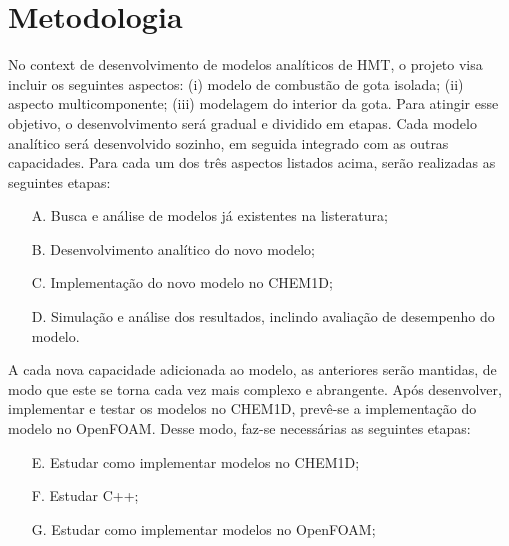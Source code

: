 \section{Metodologia}


No context de desenvolvimento de modelos analíticos de HMT, o projeto visa  incluir os seguintes aspectos:
(i) modelo de combustão de gota isolada;
(ii) aspecto multicomponente; 
(iii) modelagem do interior da gota. 
Para atingir esse objetivo, o desenvolvimento será gradual e dividido em etapas. 
Cada modelo analítico será desenvolvido sozinho, em seguida integrado com as outras capacidades.
Para cada um dos três aspectos listados acima, serão realizadas as seguintes etapas:
\begin{enumerate}
    \item[A.] Busca e análise de modelos já existentes na listeratura;
    \item[B.] Desenvolvimento analítico do novo modelo;
    \item[C.] Implementação do novo modelo no CHEM1D;
    \item[D.] Simulação e análise dos resultados, inclindo avaliação de desempenho do modelo.
\end{enumerate}
A cada nova capacidade adicionada ao modelo, as anteriores serão mantidas, de modo que este se torna cada vez mais complexo e abrangente. 
Após desenvolver, implementar e testar os modelos no CHEM1D, prevê-se a implementação do modelo no OpenFOAM. Desse modo, faz-se necessárias as seguintes etapas:
\begin{itemize}
    \item[E.] Estudar como implementar modelos no CHEM1D; 
    \item[F.] Estudar C++; 
    \item[G.] Estudar como implementar modelos no OpenFOAM; 
\end{itemize}

